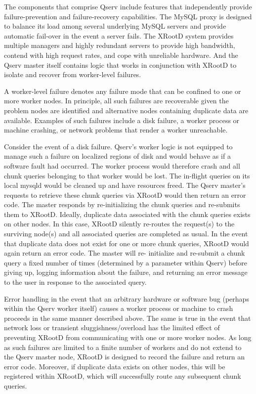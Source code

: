 \documentclass[DM,lsstdraft,toc]{lsstdoc}
\begin{document}
The components that comprise Qserv include features that independently provide
failure-prevention and failure-recovery capabilities. The MySQL proxy is
designed to balance its load among several underlying MySQL servers and
provide automatic fail-over in the event a server fails. The XRootD system
provides multiple managers and highly redundant servers to provide high
bandwidth, contend with high request rates, and cope with unreliable hardware.
And the Qserv master itself contains logic that works in conjunction with
XRootD to isolate and recover from worker-level failures.

A worker-level failure denotes any failure mode that can be confined to one or
more worker nodes. In principle, all such failures are recoverable given the
problem nodes are identified and alternative nodes containing duplicate data
are available. Examples of such failures include a disk failure, a worker
process or machine crashing, or network problems that render a worker
unreachable.

Consider the event of a disk failure. Qserv's worker logic is not equipped to
manage such a failure on localized regions of disk and would behave as if a
software fault had occurred. The worker process would therefore crash and all
chunk queries belonging to that worker would be lost. The in-flight queries on
its local mysqld would be cleaned up and have resources freed. The Qserv
master's requests to retrieve these chunk queries via XRootD would then return
an error code. The master responds by re-initializing the chunk queries and
re-submits them to XRootD. Ideally, duplicate data associated with the chunk
queries exists on other nodes. In this case, XRootD silently re-routes the
request(s) to the surviving node(s) and all associated queries are completed
as usual. In the event that duplicate data does not exist for one or more
chunk queries, XRootD would again return an error code. The master will re-
initialize and re-submit a chunk query a fixed number of times (determined by
a parameter within Qserv) before giving up, logging information about the
failure, and returning an error message to the user in response to the
associated query.

Error handling in the event that an arbitrary hardware or software bug
(perhaps within the Qserv worker itself) causes a worker process or machine to
crash proceeds in the same manner described above. The same is true in the
event that network loss or transient sluggishness/overload has the limited
effect of preventing XRootD from communicating with one or more worker nodes.
As long as such failures are limited to a finite number of workers and do not
extend to the Qserv master node, XRootD is designed to record the failure and
return an error code. Moreover, if duplicate data exists on other nodes, this
will be registered within XRootD, which will successfully route any subsequent
chunk queries.
\end{document}

